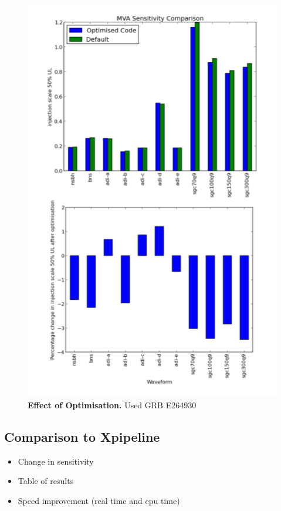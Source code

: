 \documentclass[11pt]{cuthesis}
\begin{document}
\begin{figure} %
\begin{center}
\includegraphics[width=0.8\linewidth]{opt_comparison.png}
\end{center}
\caption{\textbf{Effect of Optimisation.} Used GRB E264930  }
\label{fig:opt compare}
\end{figure}

\subsection{Comparison to Xpipeline}
\begin{itemize}
\item Change in sensitivity
\item Table of results
\item Speed improvement (real time and cpu time)
\end{itemize}
\end{document}
